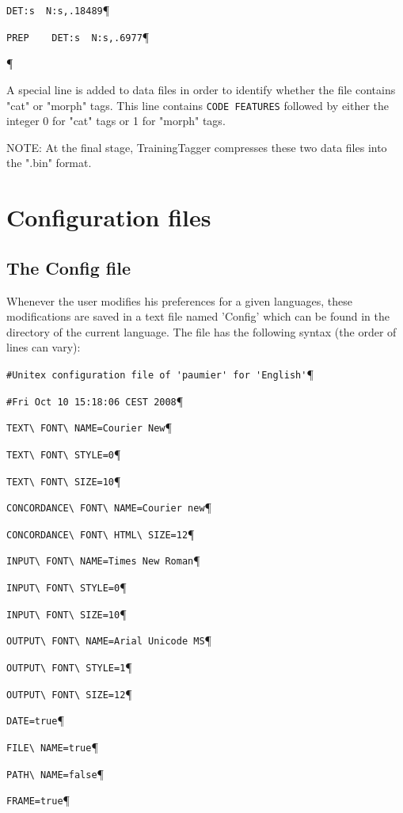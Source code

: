 \verb+DET:s	 N:s,.18489+\P

\verb+PREP	  DET:s  N:s,.6977+\P

\P

\bigskip
\noindent A special line is added to data files in order to identify whether the file contains "cat" or "morph" tags. 
This line contains \verb+CODE FEATURES+ followed by either the integer 0 for "cat" tags or 1 for
"morph" tags.

\bigskip
\noindent NOTE: At the final stage, TrainingTagger compresses these two data files into the ".bin" format.


\section{Configuration files}
\subsection{The Config file}
Whenever the user modifies his preferences for a given languages, these
modifications are saved in a text file named 'Config' which can be found in the
directory of the current language. The file has the following syntax (the order
of lines can vary):


\bigskip
\verb$#Unitex configuration file of 'paumier' for 'English'$\P

\verb$#Fri Oct 10 15:18:06 CEST 2008$\P

\verb$TEXT\ FONT\ NAME=Courier New$\P

\verb$TEXT\ FONT\ STYLE=0$\P

\verb$TEXT\ FONT\ SIZE=10$\P

\verb$CONCORDANCE\ FONT\ NAME=Courier new$\P

\verb$CONCORDANCE\ FONT\ HTML\ SIZE=12$\P

\verb$INPUT\ FONT\ NAME=Times New Roman$\P

\verb$INPUT\ FONT\ STYLE=0$\P

\verb$INPUT\ FONT\ SIZE=10$\P

\verb$OUTPUT\ FONT\ NAME=Arial Unicode MS$\P

\verb$OUTPUT\ FONT\ STYLE=1$\P

\verb$OUTPUT\ FONT\ SIZE=12$\P

\verb$DATE=true$\P

\verb$FILE\ NAME=true$\P

\verb$PATH\ NAME=false$\P

\verb$FRAME=true$\P

